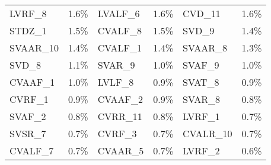 \begin{center}
\begin{longtable}{m{2cm}<{\centering}m{2cm}<{\centering}m{2cm}<{\centering}m{2cm}<{\centering}m{2cm}<{\centering}m{2cm}<{\centering}}
            \cellcolor{cyan}LVRF\_8                          & \cellcolor{cyan}1.6\%                            & \cellcolor{cyan}LVALF\_6                         & \cellcolor{cyan}1.6\%                            & CVD\_11                          & 1.6\%                            \\
            STDZ\_1                                          & 1.5\%                                            & \cellcolor{cyan}CVALF\_8                         & \cellcolor{cyan}1.5\%                            & SVD\_9                           & 1.4\%                            \\
            \cellcolor{pink}SVAAR\_10                        & \cellcolor{pink}1.4\%                            & \cellcolor{cyan}CVALF\_1                         & \cellcolor{cyan}1.4\%                            & \cellcolor{pink}SVAAR\_8                         & \cellcolor{pink}1.3\%                            \\
            SVD\_8                                           & 1.1\%                                            & \cellcolor{pink}SVAR\_9                          & \cellcolor{pink}1.0\%                            & \cellcolor{cyan}SVAF\_9                          & \cellcolor{cyan}1.0\%                            \\
            \cellcolor{cyan}CVAAF\_1                         & \cellcolor{cyan}1.0\%                            & \cellcolor{cyan}LVLF\_8                          & \cellcolor{cyan}0.9\%                            & SVAT\_8                          & 0.9\%                            \\
            \cellcolor{cyan}CVRF\_1                          & \cellcolor{cyan}0.9\%                            & \cellcolor{cyan}CVAAF\_2                         & \cellcolor{cyan}0.9\%                            & \cellcolor{pink}SVAR\_8                          & \cellcolor{pink}0.8\%                            \\
            \cellcolor{cyan}SVAF\_2                          & \cellcolor{cyan}0.8\%                            & \cellcolor{pink}CVRR\_11                         & \cellcolor{pink}0.8\%                            & \cellcolor{cyan}LVRF\_1                          & \cellcolor{cyan}0.7\%                            \\
            \cellcolor{pink}SVSR\_7                          & \cellcolor{pink}0.7\%                            & \cellcolor{cyan}CVRF\_3                          & \cellcolor{cyan}0.7\%                            & \cellcolor{pink}CVALR\_10                        & \cellcolor{pink}0.7\%                            \\
            \cellcolor{cyan}CVALF\_7                         & \cellcolor{cyan}0.7\%                            & \cellcolor{pink}CVAAR\_5                         & \cellcolor{pink}0.7\%                            & \cellcolor{cyan}LVRF\_2                          & \cellcolor{cyan}0.6\%                           
      \end{longtable}
\end{center}

